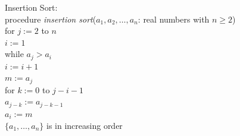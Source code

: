 \documentclass[12pt]{article}
\begin{document}
\begin{alg} Insertion Sort: \\
procedure \textit{insertion sort}($a_1, a_2, \dots, a_n$: real numbers with $n \geq 2$) \\ for $j := 2$ to $n$ \\ \indent $i := 1$ \\ \indent while $a_j > a_i$ \\ \indent \indent $i := i + 1$ \\ \indent $m := a_j$ \\ \indent for $k := 0$ to $j - i - 1$ \\ \indent \indent $a_{j - k} := a_{j - k - 1}$ \\ \indent $a_i := m$ \\ $\{a_1, \dots, a_n\}$ is in increasing order \end{alg}
\end{document}
